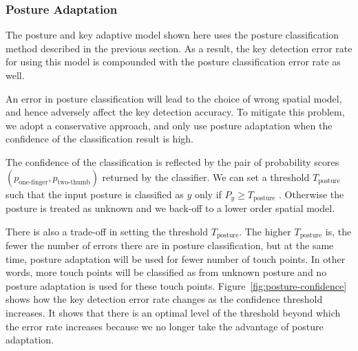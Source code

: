 \documentclass{sigchi}
\begin{document}
\subsubsection{Posture Adaptation}\label{sec:off-device-posture}
The posture and key adaptive model shown here uses the posture classification
method described in the previous section. As a result, the
key detection error rate for using this model is compounded with the posture
classification error rate as well. 

An error in posture classification will lead to the choice of wrong spatial model,
and hence adversely affect the key detection accuracy. To mitigate this problem, we
adopt a conservative approach, and only use posture adaptation when the confidence of
the classification result is high.

The confidence of the classification is reflected by the pair of probability 
scores $(p_{\text{one-finger}}, p_{\text{two-thumb}})$ returned by the classifier. 
We can set a threshold $T_{\text{posture}}$ such that the input posture is classified
as $y$ only if $P_y \ge T_{\text{posture}}$ . Otherwise the posture is treated as
unknown and we back-off to a lower order spatial model.

There is also a trade-off in setting the threshold $T_{\text{posture}}$. The higher
 $T_{\text{posture}}$ is, the fewer the number of errors there are in posture classification, but at the same time,
 posture adaptation will be used for fewer number of touch points. In other words, 
 more touch points will be classified as from unknown posture and no posture adaptation 
 is used for these touch points. Figure~\ref{fig:posture-confidence} shows how
 the key detection error rate changes as the confidence threshold increases. It 
 shows that there is an optimal level of the threshold beyond which the error rate
 increases because we no longer take the advantage of posture adaptation.
\end{document}
